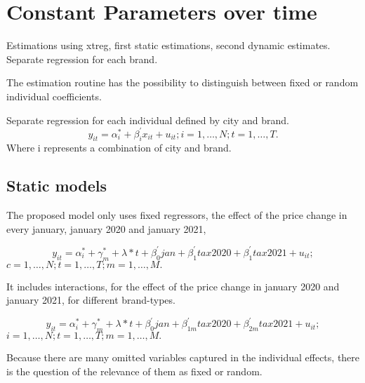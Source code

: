 \documentclass[]{article}
\begin{document}




\section{Constant Parameters over time}
Estimations using xtreg, first static estimations, second dynamic estimates.
Separate regression for each brand.

The estimation routine has the possibility to distinguish between fixed or random individual coefficients.

Separate regression for each individual defined by city and brand.
\begin{equation*}
	y_{it} = \alpha_{i}^{*} + \beta_{i}^{'}x_{it} + u_{it}; i = 1,\ldots,N; t=1,\ldots,T.
\end{equation*}
Where i represents a combination of city and brand.


\subsection{Static models}
The proposed model only uses fixed regressors, the effect of the price change in every january, january 2020 and january 2021,

\begin{equation*} 
	y_{it}  = \alpha_{i}^{*} + \gamma_{m}^{*} + \lambda*t + \beta_{0}^{'}jan + \beta_{1}^{'}tax2020 + \beta_{1}^{'}tax2021 + u_{it}
	;   \tag{4.1}
\end{equation*}
$c  = 1,\ldots,N;  t=1,\ldots,T; m=1,\ldots,M. $

It includes interactions, for the effect of the price change in january 2020 and january 2021, for different brand-types.

\begin{equation*} 
	y_{it}  = \alpha_{i}^{*} + \gamma_{m}^{*} + \lambda*t + \beta_{0}^{'}jan + \beta_{1m}^{'}tax2020 + \beta_{2m}^{'}tax2021 + u_{it}
	;   \tag{4.2}
\end{equation*}
$i  = 1,\ldots,N;  t=1,\ldots,T; m=1,\ldots,M. $

Because there are many omitted variables captured in the individual effects, there is the question of the relevance of them as fixed or random.
\end{document}
